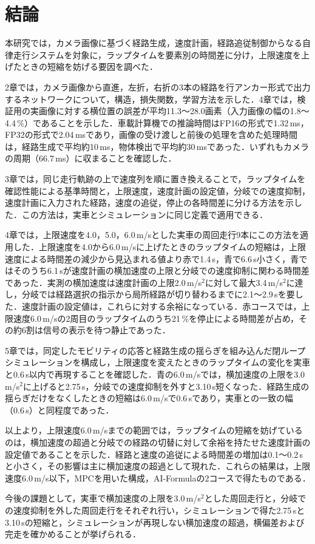 \chapter{結論}
\label{chap:conclusion}
本研究では，カメラ画像に基づく経路生成，速度計画，経路追従制御からなる自律走行システムを対象に，ラップタイムを要素別の時間差に分け，上限速度を上げたときの短縮を妨げる要因を調べた．

2章では，カメラ画像から直進，左折，右折の3本の経路を行アンカー形式で出力するネットワークについて，構造，損失関数，学習方法を示した．4章では，検証用の実画像に対する横位置の誤差が平均11.3〜28.0画素（入力画像の幅の1.8〜4.4\,\%）であることを示した．車載計算機での推論時間はFP16の形式で1.32\,ms，FP32の形式で2.04\,msであり，画像の受け渡しと前後の処理を含めた処理時間は，経路生成で平均約10\,ms，物体検出で平均約30\,msであった．いずれもカメラの周期（66.7\,ms）に収まることを確認した．

3章では，同じ走行軌跡の上で速度列を順に置き換えることで，ラップタイムを確認性能による基準時間と，上限速度，速度計画の設定値，分岐での速度抑制，速度計画に入力された経路，速度の追従，停止の各時間差に分ける方法を示した．この方法は，実車とシミュレーションに同じ定義で適用できる．

4章では，上限速度を4.0，5.0，6.0\,m/sとした実車の周回走行9本にこの方法を適用した．上限速度を4.0から6.0\,m/sに上げたときのラップタイムの短縮は，上限速度による時間差の減少から見込まれる値より赤で1.4\,s，青で6.6\,s小さく，青ではそのうち6.1\,sが速度計画の横加速度の上限と分岐での速度抑制に関わる時間差であった．実測の横加速度は速度計画の上限2.0\,m/s$^2$に対して最大3.4\,m/s$^2$に達し，分岐では経路選択の指示から局所経路が切り替わるまでに2.1〜2.9\,sを要した．速度計画の設定値は，これらに対する余裕になっている．赤コースでは，上限速度6.0\,m/sの2周目のラップタイムのうち21\,\%を停止による時間差が占め，その約6割は信号の表示を待つ静止であった．

5章では，同定したモビリティの応答と経路生成の揺らぎを組み込んだ閉ループシミュレーションを構成し，上限速度を変えたときのラップタイムの変化を実車と0.6\,s以内で再現することを確認した．青の6.0\,m/sでは，横加速度の上限を3.0\,m/s$^2$に上げると2.75\,s，分岐での速度抑制を外すと3.10\,s短くなった．経路生成の揺らぎだけをなくしたときの短縮は6.0\,m/sで0.6\,sであり，実車との一致の幅（0.6\,s）と同程度であった．

以上より，上限速度6.0\,m/sまでの範囲では，ラップタイムの短縮を妨げているのは，横加速度の超過と分岐での経路の切替に対して余裕を持たせた速度計画の設定値であることを示した．経路と速度の追従による時間差の増加は0.1〜0.2\,sと小さく，その影響は主に横加速度の超過として現れた．これらの結果は，上限速度6.0\,m/s以下，MPCを用いた構成，AI-Formulaの2コースで得たものである．

今後の課題として，実車で横加速度の上限を3.0\,m/s$^2$とした周回走行と，分岐での速度抑制を外した周回走行をそれぞれ行い，シミュレーションで得た2.75\,sと3.10\,sの短縮と，シミュレーションが再現しない横加速度の超過，横偏差および完走を確かめることが挙げられる．
